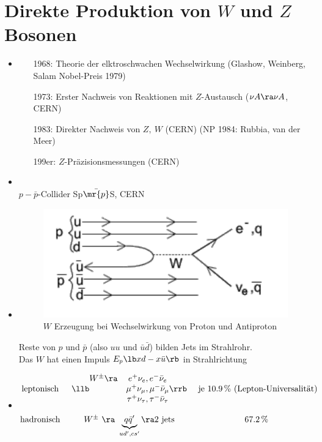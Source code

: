 \section{Direkte Produktion von \texorpdfstring{$W$}- und \texorpdfstring{$Z$}-Bosonen}
\begin{itemize}
\item {}
\begin{itemize}
\item[1968:] Theorie der elktroschwachen Wechselwirkung (Glashow, Weinberg, Salam Nobel-Preis 1979)
\item[1973:] Erster Nachweis von Reaktionen mit $Z$-Austausch ($\nu A \ra \nu A$, CERN)
\item[1983:] Direkter Nachweis von $Z,\ W$ (CERN) (NP 1984: Rubbia, van der Meer)
\item[199er:] $Z$-Präzisionsmessungen (CERN) 
\end{itemize}
\item {}\\
$p - \bar{p}$-Collider Sp$\bar{\mr{p}}$S, CERN
\item {}

\begin{figure}[!ht]
\centering
\includegraphics[width=.5\textwidth]{imgs/ep5-fig-8-16.pdf}
\caption{$W$ Erzeugung bei Wechselwirkung von Proton und Antiproton \label{fig:8.16}}
\end{figure}

\glqq Reste\grqq{} von $p$ und $\bar{p}$ (also $uu$ und $\bar{u}\bar{d}$) bilden Jets im Strahlrohr.\\
Das $W$ hat einen Impuls $E_p \lb xd - x\bar{u}\rb $ in Strahlrichtung
\item {}
\begin{align*}
\begin{matrix}
\text{leptonisch } & \llb \begin{matrix} W^\pm \ra & e^+ \nu_e, e^- \bar{\nu}_e\\ & \mu^+ \nu_\mu, \mu^- \bar{\nu}_\mu\\ &\tau^+ \nu_\tau, \tau^- \bar{\nu}_\tau \end{matrix} \rrb & \text{ je 10.9\,\% (Lepton-Universalität)}\\ & & \\
\text{hadronisch } & W^\pm$ $\ra\ \underbrace{q \bar{q}^\prime}_{ud^\prime, cs^\prime} \ra  2\text{ jets} & 67.2\,\%
\end{matrix}
\end{align*}


\end{itemize}
